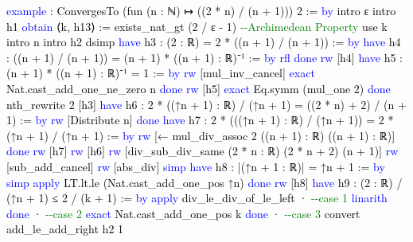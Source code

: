 \documentclass[
  letterpaper,
]{scrreprt}
\newenvironment{Shaded}{\begin{snugshade}}{\end{snugshade}}
\newcommand{\CommentTok}[1]{\textcolor[rgb]{0.37,0.37,0.37}{#1}}
\newcommand{\KeywordTok}[1]{\textcolor[rgb]{0.00,0.23,0.31}{#1}}
\newcommand{\NormalTok}[1]{\textcolor[rgb]{0.00,0.23,0.31}{#1}}
\renewcommand{\NormalTok}[1]{\textcolor[HTML]{000000}{#1}}
\renewcommand{\KeywordTok}[1]{\textcolor[HTML]{0000FF}{#1}}
\renewcommand{\CommentTok}[1]{\textcolor[HTML]{008000}{#1}}
\theoremstyle{remark}
\begin{document}
\begin{Shaded}
\begin{Highlighting}[]
\KeywordTok{example}\NormalTok{ : ConvergesTo (fun (n : ℕ) ↦ }
\NormalTok{    ((2 * n) / (n + 1))) 2 := }\KeywordTok{by}
\NormalTok{  intro ε}
\NormalTok{  intro h1}
  \KeywordTok{obtain}\NormalTok{ ⟨k, h13⟩ := }
\NormalTok{    exists\_nat\_gt (2 / ε {-} 1) }\CommentTok{{-}{-}Archimedean Property}
\NormalTok{  use k}
\NormalTok{  intro n}
\NormalTok{  intro h2}
\NormalTok{  dsimp}
  \KeywordTok{have}\NormalTok{ h3 : (2 : ℝ) = 2 * ((n + 1) / (n + 1)) := }\KeywordTok{by}
    \KeywordTok{have}\NormalTok{ h4 : ((n + 1) / (n + 1)) = }
\NormalTok{        (n + 1) * ((n + 1) : ℝ)⁻¹ := }\KeywordTok{by}
      \KeywordTok{rfl}
      \KeywordTok{done}
    \KeywordTok{rw}\NormalTok{ [h4]}
    \KeywordTok{have}\NormalTok{ h5 : (n + 1) * ((n + 1) : ℝ)⁻¹ = 1 := }\KeywordTok{by}
      \KeywordTok{rw}\NormalTok{ [mul\_inv\_cancel]}
      \KeywordTok{exact}\NormalTok{ Nat.cast\_add\_one\_ne\_zero n}
      \KeywordTok{done}
    \KeywordTok{rw}\NormalTok{ [h5]}
    \KeywordTok{exact}\NormalTok{ Eq.symm (mul\_one 2)}
    \KeywordTok{done}
\NormalTok{  nth\_rewrite 2 [h3]}
  \KeywordTok{have}\NormalTok{ h6 : 2 * ((↑n + 1) : ℝ) / (↑n + 1) = }
\NormalTok{      ((2 * n) + 2) / (n + 1) := }\KeywordTok{by}
    \KeywordTok{rw}\NormalTok{ [Distribute n]}
    \KeywordTok{done}
  \KeywordTok{have}\NormalTok{ h7 : 2 * (((↑n + 1) : ℝ) / (↑n + 1)) = }
\NormalTok{      2 * (↑n + 1) / (↑n + 1) := }\KeywordTok{by}
    \KeywordTok{rw}\NormalTok{ [← mul\_div\_assoc 2 ((n + 1) : ℝ) ((n + 1) : ℝ)]}
    \KeywordTok{done}
  \KeywordTok{rw}\NormalTok{ [h7]}
  \KeywordTok{rw}\NormalTok{ [h6]}
  \KeywordTok{rw}\NormalTok{ [div\_sub\_div\_same (2 * n : ℝ) (2 * n + 2) (n + 1)]}
  \KeywordTok{rw}\NormalTok{ [sub\_add\_cancel\textquotesingle{}]}
  \KeywordTok{rw}\NormalTok{ [abs\_div]}
  \KeywordTok{simp}
  \KeywordTok{have}\NormalTok{ h8 : |(↑n + 1 : ℝ)| = ↑n + 1 := }\KeywordTok{by}
    \KeywordTok{simp}
    \KeywordTok{apply}\NormalTok{ LT.lt.le (Nat.cast\_add\_one\_pos ↑n)}
    \KeywordTok{done}
  \KeywordTok{rw}\NormalTok{ [h8]}
  \KeywordTok{have}\NormalTok{ h9 : (2 : ℝ) / (↑n + 1) ≤ 2 / (k + 1) := }\KeywordTok{by}
    \KeywordTok{apply}\NormalTok{ div\_le\_div\_of\_le\_left}
\NormalTok{    · }\CommentTok{{-}{-}case 1}
      \KeywordTok{linarith}
      \KeywordTok{done}
\NormalTok{    · }\CommentTok{{-}{-}case 2}
      \KeywordTok{exact}\NormalTok{ Nat.cast\_add\_one\_pos k}
      \KeywordTok{done}
\NormalTok{    · }\CommentTok{{-}{-}case 3}
\NormalTok{      convert add\_le\_add\_right h2 1}

\end{Highlighting}
\end{Shaded}
\end{document}
